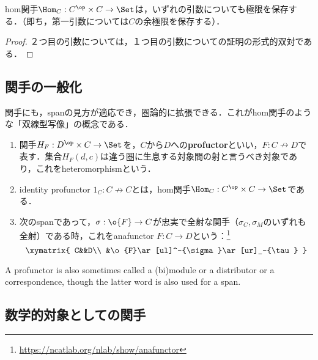 \documentclass[uplatex,dvipdfmx]{jsreport}
\begin{document}
\begin{proposition}[hom関手は極限を保存する]\mbox{}
    hom関手$\Hom_C:C^\op\times C\to\Set$は，いずれの引数についても極限を保存する．（即ち，第一引数については$C$の余極限を保存する）．
\end{proposition}
\begin{proof}
    ２つ目の引数については，１つ目の引数についての証明の形式的双対である．
\end{proof}

\subsection{関手の一般化}

\begin{tcolorbox}[colframe=ForestGreen, colback=ForestGreen!10!white, breakable ,colbacktitle=ForestGreen!40!white, coltitle=black,fonttitle=\bfseries\sffamily,
    title=]
    関手にも，spanの見方が適応でき，圏論的に拡張できる．これがhom関手のような「双線型写像」の概念である．
\end{tcolorbox}

\begin{definition}\mbox{}
    \begin{enumerate}
        \item 関手$H_F:D^\op\times C\to\Set$を，$C$から$D$への\textbf{profuctor}といい，$F:C\nrightarrow D$で表す．集合$H_F(d,c)$は違う圏に生息する対象間の射と言うべき対象であり，これをheteromorphismという．
        \item identity profunctor $1_C:C\nrightarrow C$とは，hom関手$\Hom_C:C^\op\times C\to\Set$である．
        \item 次のspanであって，$\sigma:\o{F}\to C$が忠実で全射な関手（$\sigma_C,\sigma_M$のいずれも全射）である時，これをanafunctor $F:C\to D$という：\footnote{\url{https://ncatlab.org/nlab/show/anafunctor}}
        \[\xymatrix{
            C&&D\\
            &\o{F}\ar[ul]^-{\sigma}\ar[ur]_-{\tau}
        }\]
    \end{enumerate}
\end{definition}
\begin{remark}
    A profunctor is also sometimes called a (bi)module or a distributor or a correspondence, though the latter word is also used for a span.
\end{remark}

\subsection{数学的対象としての関手}
\end{document}
